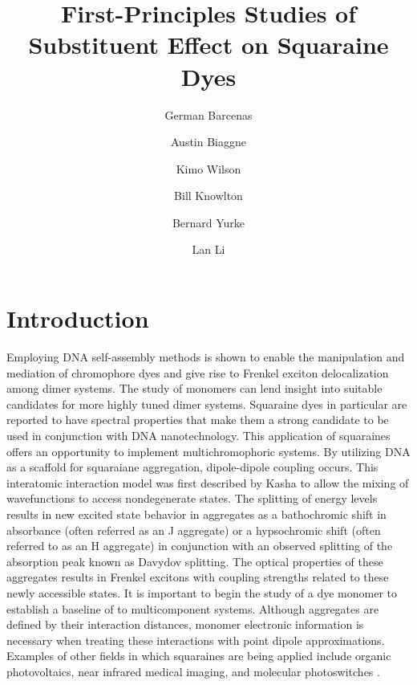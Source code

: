 \documentclass[journal=jacsat,manuscript=article]{achemso}
\title{
First-Principles Studies of Substituent Effect on Squaraine Dyes\\
}
\author{German Barcenas}
\affiliation{Boise State University}
\author{Austin Biaggne}
\affiliation{Boise State University}
\author{Kimo Wilson}
\affiliation{Boise State University}
\author{Bill Knowlton}
\affiliation{Boise State University}
\author{Bernard Yurke}
\affiliation{Boise State University}
\author{Lan Li}
\affiliation{Boise State University}
\begin{document}
\maketitle

\section{Introduction}
Employing DNA self-assembly methods is shown to enable the manipulation and mediation of chromophore dyes and give rise to Frenkel exciton delocalization among dimer systems\cite{Cannon2018LargeAggregates}. The study of monomers can lend insight into suitable candidates for more highly tuned dimer systems. Squaraine dyes in particular are reported to have spectral properties that make them a strong candidate to be used in conjunction with DNA nanotechnology\cite{Markova2013ComparisonLabels}⁠. This application of squaraines offers an opportunity to implement multichromophoric systems. 
By utilizing DNA as a scaffold for squaraiane aggregation, dipole-dipole coupling occurs\cite{Cannon2017CoherentSystem}. This interatomic interaction model was first described by Kasha to allow the mixing of wavefunctions to access nondegenerate states\cite{Kasha1965TheSpectroscopy}. The splitting of energy levels results in new excited state behavior in aggregates as a bathochromic shift in absorbance (often referred as an J aggregate) or a hypsochromic shift (often referred to as an H aggregate) in conjunction with an observed splitting of the absorption peak known as Davydov splitting\cite{Zhong2019DavydovDimers}. The optical properties of these aggregates results in Frenkel excitons with coupling strengths related to these newly accessible states. 
It is important to begin the study of a dye monomer to establish a baseline of to multicomponent systems. Although aggregates are defined by their interaction distances, monomer electronic information is necessary when treating these interactions with point dipole approximations\cite{Abramavicius2009ExtractingSpectra}. Examples of other fields in which squaraines are being applied include organic photovoltaics\citep{Wei2012FunctionalizedPhotovoltaics, Chen2018DensityCell}, near infrared medical imaging\cite{Strassel2018SquaraineNm}⁠, and molecular photoswitches\citep{Kellis2019AnPhases, Scholes2011LessonsHarvesting} .
\end{document}
